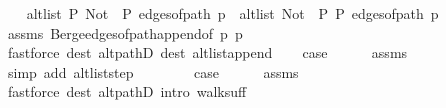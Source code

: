 \begin{isabellebody}
\ \ \isamarkupfalse%
\ {\isachardoublequoteopen}alt{\isacharunderscore}{\kern0pt}list\ P\ {\isacharparenleft}{\kern0pt}Not\ {\isasymcirc}\ P{\isacharparenright}{\kern0pt}\ {\isacharparenleft}{\kern0pt}edges{\isacharunderscore}{\kern0pt}of{\isacharunderscore}{\kern0pt}path\ {\isacharquery}{\kern0pt}p{\isacharprime}{\kern0pt}{\isacharparenright}{\kern0pt}\ {\isasymor}\ alt{\isacharunderscore}{\kern0pt}list\ {\isacharparenleft}{\kern0pt}Not\ {\isasymcirc}\ P{\isacharparenright}{\kern0pt}\ P\ {\isacharparenleft}{\kern0pt}edges{\isacharunderscore}{\kern0pt}of{\isacharunderscore}{\kern0pt}path\ {\isacharquery}{\kern0pt}p{\isacharprime}{\kern0pt}{\isacharparenright}{\kern0pt}{\isachardoublequoteclose}\isanewline
\ \ \ \ \isamarkupfalse%
\ assms{\isacharparenleft}{\kern0pt}{}{\isacharparenright}{\kern0pt}\ Berge{\isachardot}{\kern0pt}edges{\isacharunderscore}{\kern0pt}of{\isacharunderscore}{\kern0pt}path{\isacharunderscore}{\kern0pt}append{\isacharbrackleft}{\kern0pt}of\ p\ {\isacharquery}{\kern0pt}p{\isacharprime}{\kern0pt}{\isacharbrackright}{\kern0pt}\isanewline
\ \ \ \ \isamarkupfalse%
\ {\isacharparenleft}{\kern0pt}fastforce\ dest{\isacharcolon}{\kern0pt}\ alt{\isacharunderscore}{\kern0pt}pathD{\isacharparenleft}{\kern0pt}{}{\isacharparenright}{\kern0pt}\ dest{\isacharcolon}{\kern0pt}\ alt{\isacharunderscore}{\kern0pt}list{\isacharunderscore}{\kern0pt}append{\isacharunderscore}{\kern0pt}{}{\isacharparenright}{\kern0pt}\isanewline
\ \ \isamarkupfalse%
\ {\isacharquery}{\kern0pt}case\isanewline
\ \ \ \ \isamarkupfalse%
\ assms{\isacharparenleft}{\kern0pt}{}{\isacharparenright}{\kern0pt}\isanewline
\ \ \ \ \isamarkupfalse%
\ {\isacharparenleft}{\kern0pt}simp\ add{\isacharcolon}{\kern0pt}\ alt{\isacharunderscore}{\kern0pt}list{\isacharunderscore}{\kern0pt}step{\isacharparenright}{\kern0pt}\isanewline
{}\isamarkupfalse%
\isanewline
\ \ \isamarkupfalse%
\ {}\isanewline
\ \ \isamarkupfalse%
\ {\isacharquery}{\kern0pt}case\isanewline
\ \ \ \ \isamarkupfalse%
\ assms{\isacharparenleft}{\kern0pt}{}{\isacharparenright}{\kern0pt}\isanewline
\ \ \ \ \isamarkupfalse%
\ {\isacharparenleft}{\kern0pt}fastforce\ dest{\isacharcolon}{\kern0pt}\ alt{\isacharunderscore}{\kern0pt}pathD{\isacharparenleft}{\kern0pt}{}{\isacharparenright}{\kern0pt}\ intro{\isacharcolon}{\kern0pt}\ walk{\isacharunderscore}{\kern0pt}suff{\isacharparenright}{\kern0pt}\isanewline

\end{isabellebody}

